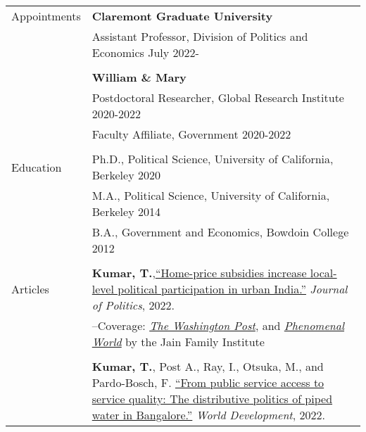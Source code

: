 \documentclass[letterpaper, 11pt]{article}
\begin{document}
\begin{longtable}{p{1in}p{5.5in}}

Appointments 
& \textbf{Claremont Graduate University} \hfill  \\
& Assistant Professor, Division of Politics and Economics \hfill July 2022-\\

& \\

& \textbf{William \& Mary} \hfill \\
& Postdoctoral Researcher, Global Research Institute \hfill 2020-2022 \\
& Faculty Affiliate, Government \hfill 2020-2022 \\

& \\



{Education} 
&Ph.D., Political Science, University of California, Berkeley \hfill 2020 \\


& M.A., Political Science, University of California, Berkeley \hfill 2014 \\
& B.A., Government and Economics, Bowdoin College  \hfill 2012 \\

& \\
\nohyphens{{Articles}} 

& \textbf{Kumar, T.},\href{https://doi.org/10.1086/715605}{``Home-price subsidies increase local-level political participation in urban India.''} \textit{Journal of Politics}, 2022.\\
& --\indent Coverage: \href{https://www.washingtonpost.com/news/monkey-cage/wp/2019/01/31/heres-what-gavin-newsom-elizabeth-warren-and-microsoft-should-know-if-want-to-end-the-affordable-housing-crisis/?tid=sm_tw_cage}{\textit{The Washington Post}}, and \href{https://www.phenomenalworld.org/sources/original-and-forgery/}{\textit{Phenomenal World}} by the Jain Family Institute  \\
& \\



& \textbf{Kumar, T.}, Post A., Ray, I., Otsuka, M., and Pardo-Bosch, F. \href{https://doi.org/10.1016/j.worlddev.2021.105736}{``From public service access to service quality: The distributive politics of piped water in Bangalore.''} \textit{World Development}, 2022. \\


\end{longtable}
\end{document}
